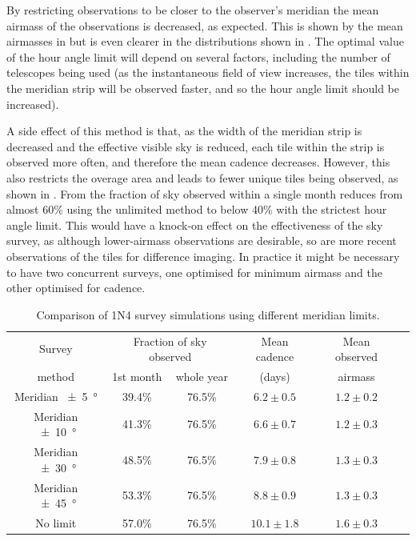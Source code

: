 \begin{colsection}
By restricting observations to be closer to the observer's meridian the mean airmass of the observations is decreased, as expected. This is shown by the mean airmasses in  but is even clearer in the distributions shown in . The optimal value of the hour angle limit will depend on several factors, including the number of telescopes being used (as the instantaneous field of view increases, the tiles within the meridian strip will be observed faster, and so the hour angle limit should be increased).

A side effect of this method is that, as the width of the meridian strip is decreased and the effective visible sky is reduced, each tile within the strip is observed more often, and therefore the mean cadence decreases. However, this also restricts the overage area and leads to fewer unique tiles being observed, as shown in . From  the fraction of sky observed within a single month reduces from almost 60\% using the unlimited method to below 40\% with the strictest hour angle limit. This would have a knock-on effect on the effectiveness of the sky survey, as although lower-airmass observations are desirable, so are more recent observations of the tiles for difference imaging. In practice it might be necessary to have two concurrent surveys, one optimised for minimum airmass and the other optimised for cadence.

\begin{table}[t]
    \begin{center}
        \begin{tabular}{c|cc|c|c|c} %
            Survey &
            \multicolumn{2}{c|}{Fraction of sky observed} &
            Mean cadence &
            Mean observed
            \\
            method &
            1st month &
            whole year &
            (days) &
            airmass
            \\
            \midrule
            Meridian  \SI{\pm5}{\degree} & 39.4\% & 76.5\% &  $6.2\pm0.5$ & $1.2\pm0.2$ \\
            Meridian \SI{\pm10}{\degree} & 41.3\% & 76.5\% &  $6.6\pm0.7$ & $1.2\pm0.3$ \\
            Meridian \SI{\pm30}{\degree} & 48.5\% & 76.5\% &  $7.9\pm0.8$ & $1.3\pm0.3$ \\
            Meridian \SI{\pm45}{\degree} & 53.3\% & 76.5\% &  $8.8\pm0.9$ & $1.3\pm0.3$ \\
            No limit                     & 57.0\% & 76.5\% & $10.1\pm1.8$ & $1.6\pm0.3$ \\
        \end{tabular}
    \end{center}
    \caption[Comparison of survey simulations using a meridian limit]{
        Comparison of 1N4 survey simulations using different meridian limits.
    }\label{tab:survey_sim_meridian}
\end{table}


\end{colsection}
